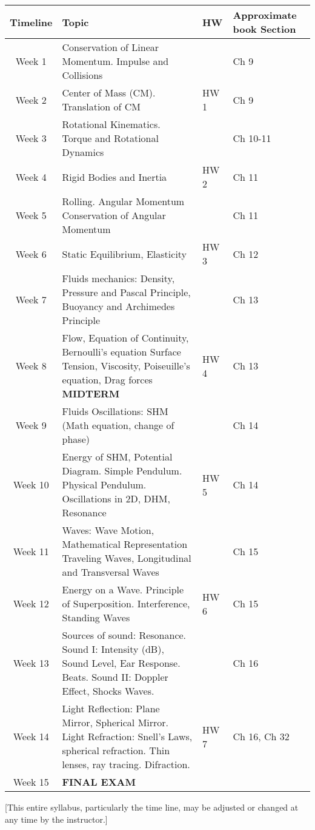 \documentclass[12pt]{article}
\begin{document}
\raggedright
\begin{center}

 \begin{tabular}{|c |l| l| l|} 


 \hline
Timeline & Topic & HW &\multicolumn{1}{p{3cm}|}{ Approximate book Section} \\ [0.5ex] 
 \hline\hline
 Week 1 &\multicolumn{1}{p{10cm}|}{ Conservation of Linear Momentum. Impulse and Collisions} &  &Ch 9  \\ 
 \hline
  Week 2 & \multicolumn{1}{p{10cm}|}{Center of Mass (CM). Translation of CM}   &HW 1 &Ch 9  \\
 \hline
 Week 3 & Rotational Kinematics. Torque and Rotational Dynamics & & Ch 10-11 \\
 \hline
 Week 4 & \multicolumn{1}{p{10cm}|}{Rigid Bodies and Inertia}  & HW 2 & Ch 11 \\
 \hline

 Week 5 & \multicolumn{1}{p{10cm}|}{ Rolling. Angular Momentum  Conservation of Angular Momentum } & & Ch 11  \\
\hline

 Week 6 & \multicolumn{1}{p{10cm}|}{  Static Equilibrium, Elasticity } &  HW 3& Ch 12  \\
\hline

 Week 7 &\multicolumn{1}{p{10cm}|}{ 
Fluids mechanics: Density, Pressure and Pascal Principle,
Buoyancy and Archimedes Principle} 
 &  & Ch 13 \\ 

 \hline
 Week 8 &\multicolumn{1}{p{10cm}|}{ Flow, Equation of  Continuity, Bernoulli's equation
Surface Tension, Viscosity, Poiseuille's equation, Drag forces \textbf{MIDTERM} }&  HW 4 &Ch 13  \\ 
 \hline
 Week 9 & \multicolumn{1}{p{10cm}|}{ Fluids
Oscillations: SHM (Math equation, change of phase)}
 & & Ch 14 \\ 
 \hline
 Week 10 &\multicolumn{1}{p{10cm}|}{ Energy of SHM, Potential Diagram. Simple Pendulum.  Physical Pendulum.
Oscillations in 2D, DHM, Resonance} & HW 5 &Ch 14  \\ 
 \hline
 Week 11 &\multicolumn{1}{p{10cm}|}{ Waves: Wave Motion,  Mathematical Representation 
Traveling Waves, Longitudinal and Transversal Waves}&  & Ch 15 \\ 
 \hline
 Week 12 &\multicolumn{1}{p{10cm}|}{ Energy on a Wave. Principle of Superposition.
Interference, Standing Waves}  & HW 6 & Ch 15 \\ 
 \hline
 Week 13 & \multicolumn{1}{p{10cm}|}{Sources of sound: Resonance. 
Sound I: Intensity (dB), Sound Level, Ear Response. Beats. Sound II: Doppler Effect, Shocks Waves.} &  & Ch 16 \\ 
 \hline
 Week 14 &\multicolumn{1}{p{10cm}|}{
Light Reflection: Plane Mirror, Spherical Mirror. Light Refraction: Snell's Laws, spherical refraction.
Thin lenses, ray tracing. Difraction. } &  HW 7  & Ch 16, Ch 32 \\ 
 \hline

 Week 15 & \textbf{FINAL EXAM}&  &  \\ 
 \hline
\end{tabular}

\end{center}


[This entire syllabus, particularly the time line, may be adjusted or changed at any time by the instructor.]
\end{document}
